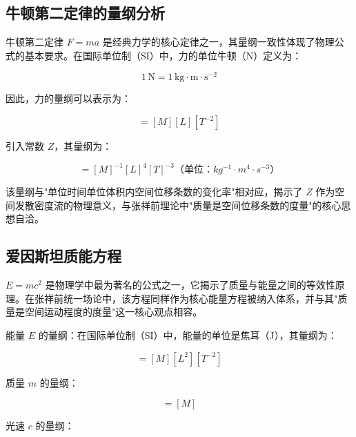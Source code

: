 \documentclass[12pt,a4paper]{article}
\begin{document}
\subsection{牛顿第二定律的量纲分析}
\label{subsection:newton_second_law_dimension}

牛顿第二定律 $F = m a$ 是经典力学的核心定律之一，其量纲一致性体现了物理公式的基本要求。在国际单位制（SI）中，力的单位牛顿（N）定义为：

\begin{equation}
1 \, \text{N} = 1 \, \text{kg} \cdot \text{m} \cdot \text{s}^{-2}
\label{eq:newton_definition}
\end{equation}

因此，力的量纲可以表示为：

\begin{equation}
[F] = [M] [L] [T^{-2}]
\label{eq:force_dimension}
\end{equation}

引入常数 $Z$，其量纲为：

\begin{equation}
[Z] = [M]^{-1}[L]^{4}[T]^{-3}（单位：kg^{-1} \cdot m^4 \cdot s^{-3}）
\label{eq:z_dimension}
\end{equation}

该量纲与"单位时间单位体积内空间位移条数的变化率"相对应，揭示了 $Z$ 作为空间发散密度流的物理意义，与张祥前理论中"质量是空间位移条数的度量"的核心思想自洽。

\subsection{爱因斯坦质能方程}
\label{subsection:einstein_energy_mass}

$E = m c^2$ 是物理学中最为著名的公式之一，它揭示了质量与能量之间的等效性原理。在张祥前统一场论中，该方程同样作为核心能量方程被纳入体系，并与其"质量是空间运动程度的度量"这一核心观点相容。

能量 $E$ 的量纲：在国际单位制（SI）中，能量的单位是焦耳（J），其量纲为：

\begin{equation}
[E] = [M][L^2][T^{-2}]
\label{eq:energy_dimension}
\end{equation}

质量 $m$ 的量纲：

\begin{equation}
[m] = [M]
\label{eq:mass_dimension}
\end{equation}

光速 $c$ 的量纲：
\end{document}
